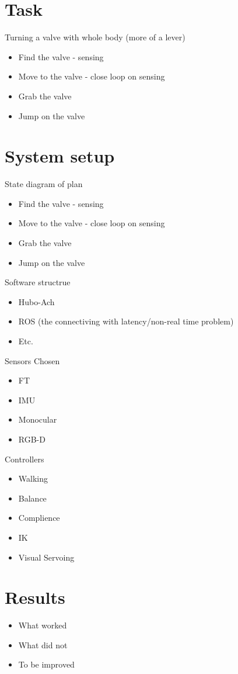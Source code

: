 \section{Task}\label{sec:task}
Turning a valve with whole body (more of a lever)
\begin{itemize}
\item Find the valve - sensing
\item Move to the valve - close loop on sensing
\item Grab the valve
\item Jump on the valve
\end{itemize}



\section{System setup}

State diagram of plan
\begin{itemize}
\item Find the valve - sensing
\item Move to the valve - close loop on sensing
\item Grab the valve
\item Jump on the valve
\end{itemize}

Software structrue
\begin{itemize}
\item Hubo-Ach
\item ROS (the connectiving with latency/non-real time problem)

\item Etc.
\end{itemize}


Sensors Chosen
\begin{itemize}
\item FT
\item IMU
\item Monocular
\item RGB-D
\end{itemize}

Controllers
\begin{itemize}
\item Walking
\item Balance
\item Complience
\item IK
\item Visual Servoing
\end{itemize}

\section{Results}\label{sec:results}
\begin{itemize}
\item What worked
\item What did not
\item To be improved
\end{itemize}
